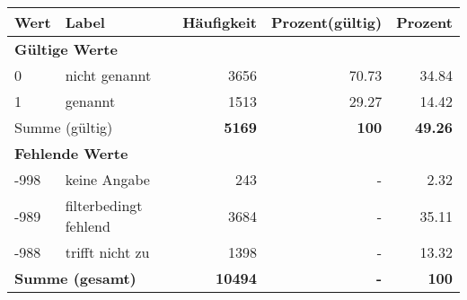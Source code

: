      \begin{longtable}{lXrrr}
     \toprule
     \textbf{Wert} & \textbf{Label} & \textbf{Häufigkeit} & \textbf{Prozent(gültig)} & \textbf{Prozent} \\
     \endhead
     \midrule
     \multicolumn{5}{l}{\textbf{Gültige Werte}}\\

     0 &
     \multicolumn{1}{X}{ nicht genannt   } &


       \num{3656} &
       \num[round-mode=places,round-precision=2]{70,73} &
         \num[round-mode=places,round-precision=2]{34,84} \\

     1 &
     \multicolumn{1}{X}{ genannt   } &


       \num{1513} &
       \num[round-mode=places,round-precision=2]{29,27} &
         \num[round-mode=places,round-precision=2]{14,42} \\
     \midrule
     \multicolumn{2}{l}{Summe (gültig)} &
       \textbf{\num{5169}} &
     \textbf{100} &
       \textbf{\num[round-mode=places,round-precision=2]{49,26}} \\
     \multicolumn{5}{l}{\textbf{Fehlende Werte}}\\
       -998 &
       keine Angabe &
         \num{243} &
        - &
         \num[round-mode=places,round-precision=2]{2,32} \\
       -989 &
       filterbedingt fehlend &
         \num{3684} &
        - &
         \num[round-mode=places,round-precision=2]{35,11} \\
       -988 &
       trifft nicht zu &
         \num{1398} &
        - &
         \num[round-mode=places,round-precision=2]{13,32} \\
     \midrule
     \multicolumn{2}{l}{\textbf{Summe (gesamt)}} &
          \textbf{\num{10494}} &
        \textbf{-} &
        \textbf{100} \\
     \bottomrule
     \end{longtable}
     
